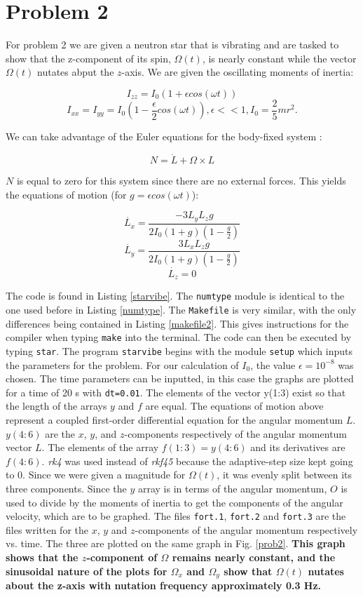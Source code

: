 \documentclass[12pt]{article}
\begin{document}
\section{Problem 2}

For problem 2 we are given a neutron star that is vibrating and are tasked to show that the z-component of its spin, $\Omega (t)$, is nearly constant while the vector $\Omega(t)$ nutates abput the $z$-axis. We are given the oscillating moments of inertia:

\[I_{zz} = I_0(1+\epsilon cos(\omega t))\]
\[I_{xx} = I_{yy} = I_0(1-\frac{\epsilon}{2}cos(\omega t)), \epsilon << 1, I_0=\frac{2}{5}mr^2.\]

We can take advantage of the Euler equations for the body-fixed system \cite{greiner}:

\[N = \dot{L}+\Omega \times L\]

$N$ is equal to zero for this system since there are no external forces.  This yields the equations of motion (for $g=\epsilon cos(\omega t)$):


\[\dot{L_x} = \frac{-3 L_y L_z g}{2 I_0 (1+g)(1-\frac{g}{2})}\]
\[\dot{L_y} = \frac{3 L_x L_z g}{2 I_0 (1+g)(1-\frac{g}{2})}\]
\[\dot{L_z} = 0\]

The code is found in Listing \ref{starvibe}.  The {\tt numtype} module is identical to the one used before in Listing \ref{numtype}.  The {\tt Makefile} is very similar, with the only differences being contained in Listing \ref{makefile2}.  This gives instructions for the compiler when typing {\tt make} into the terminal.  The code can then be executed by typing {\tt star}.  The program {\tt starvibe} begins with the module {\tt setup} which inputs the parameters for the problem.  For our calculation of $I_0$, the value $\epsilon =10^{-8}$ was chosen.  The time parameters can be inputted, in this case the graphs are plotted for a time of 20 s with  {\tt dt=0.01}.  The elements of the vector y(1:3) exist so that the length of the arrays $y$ and $f$ are equal.  The equations of motion above represent a coupled first-order differential equation for the angular momentum $L$.  $y(4:6)$ are the $x$, $y$, and $z$-components respectively of the angular momentum vector $L$.  The elements of the array $f(1:3)=y(4:6)$ and its derivatives are $f(4:6)$.  \emph{rk4} was used instead of \emph{rkf45} because the adaptive-step size kept going to 0.  Since we were given a magnitude for $\Omega(t)$, it was evenly split between its three components.  Since the $y$ array is in terms of the angular momentum, $O$ is used to divide by the moments of inertia to get the components of the angular velocity, which are to be graphed.  The files {\tt fort.1}, {\tt fort.2} and {\tt fort.3} are the files written for the $x$, $y$ and $z$-components of the angular momentum respectively vs. time.  The three are plotted on the same graph in Fig. \ref{prob2}.  \textbf{This graph shows that the $z$-component of $\Omega$ remains nearly constant, and the sinusoidal nature of the plots for $\Omega_x$ and $\Omega_y$ show that $\Omega(t)$ nutates about the z-axis with nutation frequency approximately 0.3 Hz.}
\end{document}
